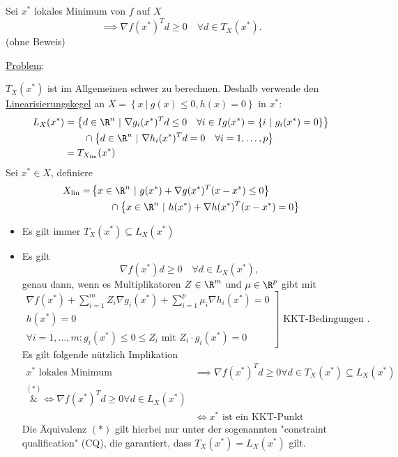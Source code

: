 \begin{satz}
\label{thm:lokalesminimumsatz}
	Sei $x^{*}$ lokales Minimum von $f$ auf $X$
	\[
		\implies \nabla f(x^{*})^{T}d \geq 0 \quad \forall d \in T_{X}(x^{*})
	.\] 
	(ohne Beweis)
\end{satz}

\underline{Problem}:

$T_{X}(x^{*})$ ist im Allgemeinen schwer zu berechnen. Deshalb verwende den \\
\underline{Linearisierungskegel} an $X=\left\{ x ~|~ g(x) \leq 0, h(x) = 0 \right\}$ in $x^{*}$:
\begin{align*}
	L_{X}(x^{*}) &= \left\{ d \in \R^{n} ~|~ \nabla g_{i}(x^{*})^{T}d \leq 0 \quad \forall i \in Ig(x^{*})= \left\{ i ~|~ g_{i}(x^{*}) = 0\right\}\right\}\\
				 &\qquad\cap \left\{ d \in \R^{n} ~|~ \nabla h_{i}(x^{*})^{T}d = 0 \quad \forall i=1, \ldots, p \right\} \\
				 &= T_{X_{\text{lin}}}(x^{*})
\end{align*}
Sei $x^{*} \in X$, definiere
\begin{align*}
	X_{\text{lin}}=&\left\{ x \in \R^{n} ~|~ g(x^{*}) + \nabla  g(x^{*})^{T}(x-x^{*}) \leq 0\right\} \\
	&\qquad\cap \left\{ x \in \R^{n} ~|~ h(x^{*}) + \nabla h(x^{*})^{T}(x-x^{*}) = 0 \right\} 
\end{align*}

\begin{itemize}
	\item Es gilt immer $T_{X}(x^{*}) \subseteq L_{X}(x^{*})$
	\item Es gilt 
		\[
		\nabla f(x^{*})d \geq 0 \quad \forall d \in L_{X}(x^{*})
		,\] genau dann, wenn es Multiplikatoren $Z \in \R^{m}$ und $\mu \in \R^{p}$ gibt mit
		\[
		\left.
		\begin{array}{r}
			\nabla f(x^{*}) + \sum_{i=1}^{m}Z_{i}\nabla g_{i}(x^{*}) + \sum_{i=1}^{p}\mu _{i}\nabla h_{i}(x^{*})=0 \\
			h(x^{*}) = 0 \\
			\forall i=1, \ldots, m \colon g_{i}(x^{*})\leq 0 \leq Z_{i} \text{ mit } Z_{i}\cdot g_{i}(x^{*}) = 0
		\end{array}
		\right] \text{ KKT-Bedingungen }
		.\] 
		Es gilt folgende nützlich Implikation
		\begin{align*}
			x^{*} \text{ lokales Minimum } &\implies \nabla f(x^{*})^{T}d \geq 0 \forall d \in T_{X}(x^{*}) \subseteq L_{X}(x^{*}) \\
			\overset{(\ast)}&{\iff}  \nabla f(x^{*})^{T}d \geq 0 \forall d \in L_{X}(x^{*}) \\
										   &\iff x^{*} \text{ ist ein KKT-Punkt }
		\end{align*}
		Die Äquivalenz $(\ast)$ gilt hierbei nur unter der sogenannten "constraint qualification" (CQ), die garantiert, dass $T_{X}(x^{*}) = L_{X}(x^{*})$ gilt.
\end{itemize}

